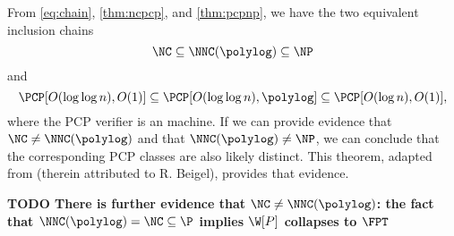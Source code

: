 \documentclass{article}
\newcommand{\todo}[1]{\textbf{TODO #1}}
\newcommand{\loglog}{\log\log}
\begin{document}
From \autoref{eq:chain}, \autoref{thm:ncpcp}, and \autoref{thm:pcpnp}, we have the two equivalent inclusion chains
\begin{equation*}
  \NC \subseteq \NNC(\polylog) \subseteq \NP
\end{equation*}
and
\begin{equation*}
  \PCP[O(\loglog n), O(1)] \subseteq \PCP[O(\loglog n), \polylog] \subseteq \PCP[O(\log n), O(1)],
\end{equation*}
where the PCP verifier is an \NC{} machine.
If we can provide evidence that $\NC \neq \NNC(\polylog)$ and that $\NNC(\polylog) \neq \NP$, we can conclude that the corresponding PCP classes are also likely distinct.
This theorem, adapted from \autocite[Theorem~1]{dt90} (therein attributed to R. Beigel), provides that evidence.

\todo{There is further evidence that $\NC \neq \NNC(\polylog)$: the fact that $\NNC(\polylog) = \NC \subseteq \P$ implies $\W[P]$ collapses to $\FPT$}
\end{document}
